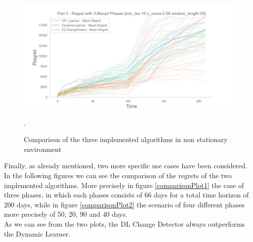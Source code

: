 \begin{figure}[!htb]
    \centering
    \includegraphics[width=\textwidth]{images/CompleteThreeDifferentPhases.jpeg}
    \caption{Comparison of the three implemented algorithms in non stationary environment}.
    \label{regretPart3CompleteFig}
\end{figure}

Finally, as already mentioned, two more specific use cases have been considered. In the following figures we can see the comparison of the regrets of the two implemented algorithms. More precisely in figure \ref{comparisonPlot1} the case of three phases, in which each phases consists of 66 days for a total time horizon of 200 days, while in figure \ref{comparisonPlot2} the scenario of four different phases more precisely of 50, 20, 90 and 40 days.\\ As we can see from the two plots, the DL Change Detector always outperforms the Dynamic Learner.

